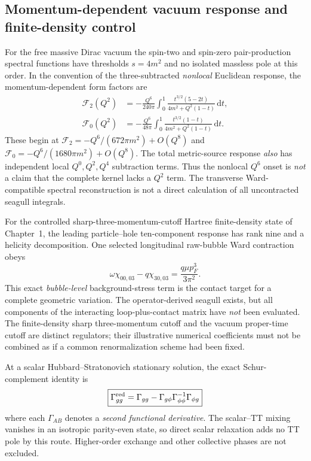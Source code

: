 \documentclass[11pt,a4paper]{article}
\newcommand{\dd}{\mathrm d}
\begin{document}
\subsection{Momentum-dependent vacuum response and finite-density control}
\label{sec:qgd075-form-factors}
For the free massive Dirac vacuum the spin-two and spin-zero
pair-production spectral functions have thresholds $s=4m^2$ and no
isolated massless pole at this order. In the convention of the
three-subtracted \emph{nonlocal} Euclidean response, the
momentum-dependent form factors are
\begin{equation}\label{eq:qgd075-form-factors}
 \boxed{\begin{aligned}
 \mathcal F_2(Q^2)&=-\frac{Q^6}{240\pi}\int_0^1
 \frac{t^{3/2}(5-2t)}{4m^2+Q^2(1-t)}\,\dd t,\\
 \mathcal F_0(Q^2)&=-\frac{Q^6}{48\pi}\int_0^1
 \frac{t^{3/2}(1-t)}{4m^2+Q^2(1-t)}\,\dd t.
 \end{aligned}}
\end{equation}
These begin at $\mathcal F_2=-Q^6/(672\pi m^2)+O(Q^8)$ and
$\mathcal F_0=-Q^6/(1680\pi m^2)+O(Q^8)$.
The total metric-source response \emph{also} has independent local
$Q^0,Q^2,Q^4$ subtraction terms. Thus the nonlocal $Q^6$ onset is
\emph{not} a claim that the complete kernel lacks a $Q^2$ term.
The transverse Ward-compatible spectral reconstruction is not a direct
calculation of all uncontracted seagull integrals.

For the controlled sharp-three-momentum-cutoff Hartree finite-density
state of Chapter~1, the leading particle--hole ten-component response
has rank nine and a helicity decomposition. One selected longitudinal
raw-bubble Ward contraction obeys
\begin{equation}\label{eq:qgd075-ward-contact}
 \boxed{\omega\chi_{00,03}-q\chi_{30,03}
 =\frac{q\mu p_F^3}{3\pi^2}.}
\end{equation}
This exact \emph{bubble-level} background-stress term is the contact
target for a complete geometric variation. The operator-derived
seagull exists, but all components of the interacting loop-plus-contact
matrix have \emph{not} been evaluated. The finite-density sharp
three-momentum cutoff and the vacuum proper-time cutoff are distinct
regulators; their illustrative numerical coefficients must not be
combined as if a common renormalization scheme had been fixed.

At a scalar Hubbard--Stratonovich stationary solution, the exact
Schur-complement identity is
\begin{equation}\label{eq:qgd075-schur}
 \boxed{\Gamma_{gg}^{\rm red}=\Gamma_{gg}
 -\Gamma_{g\phi}\Gamma_{\phi\phi}^{-1}\Gamma_{\phi g}}
\end{equation}
where each $\Gamma_{AB}$ denotes a \emph{second functional derivative}.
The scalar--TT mixing vanishes in an isotropic parity-even state,
so direct scalar relaxation adds no TT pole by this route. Higher-order
exchange and other collective phases are not excluded.
\end{document}
